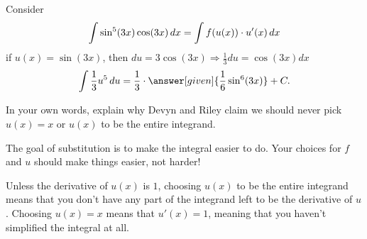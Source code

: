 \documentclass{ximera}
\begin{document}
\begin{problem}
  Consider
  \[
  \int \sin^5(3x) \cos(3x) \mathop{}\!d x = \int f(u(x)) \cdot u'(x) \mathop{}\!d x
  \]
  if $u(x) = \sin(3x)$, then $du=3\cos(3x)\Rightarrow \frac{1}{3}du=\cos(3x)dx$
  \[
  \int \frac{1}{3} u^5 \d u=\frac{1}{3}\cdot\answer[given]{\frac{1}{6}\sin^6(3x)}+C.
  \]


\end{problem}

\begin{problem}
	In your own words, explain why Devyn and Riley claim we should never 
	pick $u(x) = x$ or $u(x)$ to be the entire integrand.
	\begin{freeResponse}
		The goal of substitution is to make the integral easier to do.  Your choices
		for $f$ and $u$ should make things easier, not harder!
	
		Unless the derivative of $u(x)$ is $1$, choosing $u(x)$ to be the entire
		integrand means that you don't have any part of the integrand left to be
		the derivative of $u$.  Choosing $u(x) = x$ means that $u'(x) = 1$, meaning
		that you haven't simplified the integral at all.  
	\end{freeResponse}
\end{problem}

%
\end{document}
